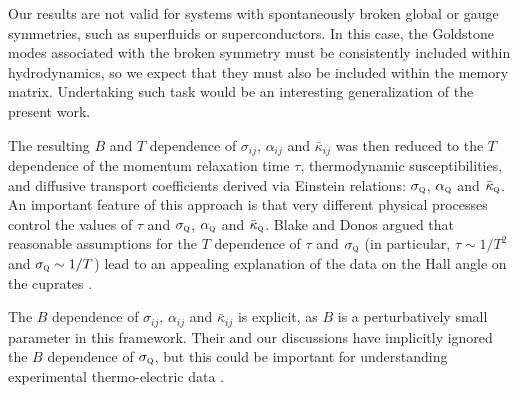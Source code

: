 \documentclass[10pt, oneside]{book}
\begin{document}
\begin{doublespace}
Our results are not valid for systems with spontaneously broken global or gauge symmetries, such as superfluids or superconductors.   In this case, the Goldstone modes associated with the broken symmetry must be consistently included within hydrodynamics, so we expect that they must also be included within the memory matrix.   Undertaking such task would be an interesting generalization of the present work.

The resulting $B$ and $T$ dependence of $\sigma_{ij}$, $\alpha_{ij}$ and $\bar\kappa_{ij}$ was then reduced to the $T$ dependence of
the momentum relaxation time $\tau$,  thermodynamic susceptibilities, and diffusive transport coefficients derived via Einstein relations: $\sigma_{\textsc{q}}$, $\alpha_{\textsc{q}}$ and $\bar\kappa_{\textsc{q}}$. An important feature of this approach is that very different physical processes control the values of $\tau$ and  $\sigma_{\textsc{q}}$, $\alpha_{\textsc{q}}$ and $\bar\kappa_{\textsc{q}}$.    Blake and Donos \cite{Blake:2014yla}
argued that reasonable assumptions for the $T$ dependence of $\tau$ and $\sigma_{\textsc{q}}$ (in particular, $\tau \sim 1/T^2$ and $\sigma_{\textsc{q}} \sim 1/T$) lead to an appealing explanation of the data
on the Hall angle on the cuprates \cite{Chien1991}. 

The $B$ dependence of $\sigma_{ij}$, $\alpha_{ij}$ and $\bar\kappa_{ij}$ is explicit, as $B$ is a perturbatively small parameter  in this framework.   Their and our discussions have implicitly ignored the $B$ dependence of $\sigma_{\textsc{q}}$, but this could
be important for understanding experimental thermo-electric data \cite{Hartnoll:2015sea,Khveshchenko:2015xea}.  


\end{doublespace}
\end{document}
